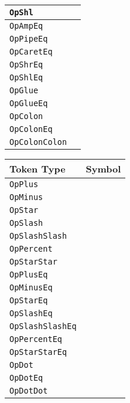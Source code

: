 \begin{table}[h]
{\begin{tabular}[t]{ll}
        \texttt{OpShl} & \op{<\textasciitilde} \\
        \hline
        \texttt{OpAmpEq} & \op{\&=} \\
        \texttt{OpPipeEq} & \op{|=} \\
        \texttt{OpCaretEq} & \op{\textasciicircum=} \\
        \texttt{OpShrEq} & \op{\textasciitilde>=} \\
        \texttt{OpShlEq} & \op{<\textasciitilde=} \\
        \hline
        \texttt{OpGlue} & \op{<>} \\
        \texttt{OpGlueEq} & \op{<>=} \\
        \texttt{OpColon} & \op{:} \\
        \texttt{OpColonEq} & \op{:=} \\
        \hline
        \texttt{OpColonColon} & \op{::} \\
        \hline
    \end{tabular}
}
\hfill
\parbox[t]{0.45\linewidth}{
    \centering
    \begin{tabular}[t]{ll}
        \hline
        \textbf{Token Type} & \textbf{Symbol} \\
        \hline
        \texttt{OpPlus} & \op{+} \\
        \texttt{OpMinus} & \op{-} \\
        \texttt{OpStar} & \op{*} \\
        \texttt{OpSlash} & \op{/} \\
        \texttt{OpSlashSlash} & \op{//} \\
        \texttt{OpPercent} & \op{\%} \\
        \texttt{OpStarStar} & \op{**} \\
        \hline
        \texttt{OpPlusEq} & \op{+=} \\
        \texttt{OpMinusEq} & \op{-=} \\
        \texttt{OpStarEq} & \op{*=} \\
        \texttt{OpSlashEq} & \op{/=} \\
        \texttt{OpSlashSlashEq} & \op{//=} \\
        \texttt{OpPercentEq} & \op{\%=} \\
        \texttt{OpStarStarEq} & \op{**=} \\
        \hline
        \texttt{OpDot} & \op{.} \\
        \texttt{OpDotEq} & \op{.=} \\
        \texttt{OpDotDot} & \op{..} \\

\end{tabular}}
\end{table}
